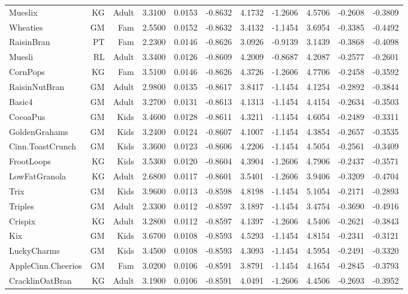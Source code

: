 \begin{longtable}{@{}lrrrrrrrrrr@{}}
Mueslix & KG & Adult & 3.3100 & 0.0153 & -0.8632 & 4.1732 & -1.2606 & 4.5706 & -0.2608 & -0.3809 \\
Wheaties & GM & Fam & 2.5500 & 0.0152 & -0.8632 & 3.4132 & -1.1454 & 3.6954 & -0.3385 & -0.4492 \\
RaisinBran & PT & Fam & 2.2300 & 0.0146 & -0.8626 & 3.0926 & -0.9139 & 3.1439 & -0.3868 & -0.4098 \\
Muesli & RL & Adult & 3.3400 & 0.0126 & -0.8609 & 4.2009 & -0.8687 & 4.2087 & -0.2577 & -0.2601 \\
CornPops & KG & Fam & 3.5100 & 0.0146 & -0.8626 & 4.3726 & -1.2606 & 4.7706 & -0.2458 & -0.3592 \\
RaisinNutBran & GM & Adult & 2.9800 & 0.0135 & -0.8617 & 3.8417 & -1.1454 & 4.1254 & -0.2892 & -0.3844 \\
Basic4 & GM & Adult & 3.2700 & 0.0131 & -0.8613 & 4.1313 & -1.1454 & 4.4154 & -0.2634 & -0.3503 \\
CocoaPus & GM & Kids & 3.4600 & 0.0128 & -0.8611 & 4.3211 & -1.1454 & 4.6054 & -0.2489 & -0.3311 \\
GoldenGrahams & GM & Kids & 3.2400 & 0.0124 & -0.8607 & 4.1007 & -1.1454 & 4.3854 & -0.2657 & -0.3535 \\
Cinn.ToastCrunch & GM & Kids & 3.3600 & 0.0123 & -0.8606 & 4.2206 & -1.1454 & 4.5054 & -0.2561 & -0.3409 \\
FrootLoops & KG & Kids & 3.5300 & 0.0120 & -0.8604 & 4.3904 & -1.2606 & 4.7906 & -0.2437 & -0.3571 \\
LowFatGranola & KG & Adult & 2.6800 & 0.0117 & -0.8601 & 3.5401 & -1.2606 & 3.9406 & -0.3209 & -0.4704 \\
Trix & GM & Kids & 3.9600 & 0.0113 & -0.8598 & 4.8198 & -1.1454 & 5.1054 & -0.2171 & -0.2893 \\
Triples & GM & Adult & 2.3300 & 0.0112 & -0.8597 & 3.1897 & -1.1454 & 3.4754 & -0.3690 & -0.4916 \\
Crispix & KG & Adult & 3.2800 & 0.0112 & -0.8597 & 4.1397 & -1.2606 & 4.5406 & -0.2621 & -0.3843 \\
Kix & GM & Kids & 3.6700 & 0.0108 & -0.8593 & 4.5293 & -1.1454 & 4.8154 & -0.2341 & -0.3121 \\
LuckyCharms & GM & Kids & 3.4500 & 0.0108 & -0.8593 & 4.3093 & -1.1454 & 4.5954 & -0.2491 & -0.3320 \\
AppleCinn.Cheerios & GM & Fam & 3.0200 & 0.0106 & -0.8591 & 3.8791 & -1.1454 & 4.1654 & -0.2845 & -0.3793 \\
CracklinOatBran & KG & Adult & 3.1900 & 0.0106 & -0.8591 & 4.0491 & -1.2606 & 4.4506 & -0.2693 & -0.3952 \\

\end{longtable}
